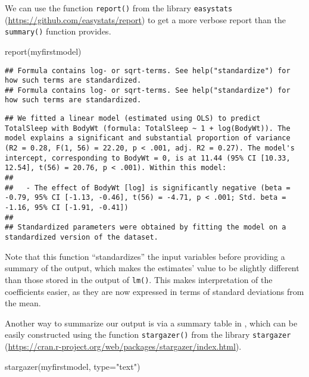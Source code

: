 \documentclass[
]{book}
\newenvironment{Shaded}{\begin{snugshade}}{\end{snugshade}}
\newcommand{\AttributeTok}[1]{\textcolor[rgb]{0.77,0.63,0.00}{#1}}
\newcommand{\FunctionTok}[1]{\textcolor[rgb]{0.00,0.00,0.00}{#1}}
\newcommand{\NormalTok}[1]{#1}
\newcommand{\StringTok}[1]{\textcolor[rgb]{0.31,0.60,0.02}{#1}}
\begin{document}
We can use the function \texttt{report()} from the library \texttt{easystats} (\url{https://github.com/easystats/report}) to get a more verbose report than the \texttt{summary()} function provides.

\begin{Shaded}
\begin{Highlighting}[]
\FunctionTok{report}\NormalTok{(myfirstmodel)}
\end{Highlighting}
\end{Shaded}

\begin{verbatim}
## Formula contains log- or sqrt-terms. See help("standardize") for how such terms are standardized.
## Formula contains log- or sqrt-terms. See help("standardize") for how such terms are standardized.
\end{verbatim}

\begin{verbatim}
## We fitted a linear model (estimated using OLS) to predict TotalSleep with BodyWt (formula: TotalSleep ~ 1 + log(BodyWt)). The model explains a significant and substantial proportion of variance (R2 = 0.28, F(1, 56) = 22.20, p < .001, adj. R2 = 0.27). The model's intercept, corresponding to BodyWt = 0, is at 11.44 (95% CI [10.33, 12.54], t(56) = 20.76, p < .001). Within this model:
## 
##   - The effect of BodyWt [log] is significantly negative (beta = -0.79, 95% CI [-1.13, -0.46], t(56) = -4.71, p < .001; Std. beta = -1.16, 95% CI [-1.91, -0.41])
## 
## Standardized parameters were obtained by fitting the model on a standardized version of the dataset.
\end{verbatim}

Note that this function ``standardizes'' the input variables before providing a summary of the output, which makes the estimates' value to be slightly different than those stored in the output of \texttt{lm()}. This makes interpretation of the coefficients easier, as they are now expressed in terms of standard deviations from the mean.

Another way to summarize our output is via a summary table in , which can be easily constructed using the function \texttt{stargazer()} from the library \texttt{stargazer} (\url{https://cran.r-project.org/web/packages/stargazer/index.html}).

\begin{Shaded}
\begin{Highlighting}[]
\FunctionTok{stargazer}\NormalTok{(myfirstmodel, }\AttributeTok{type=}\StringTok{"text"}\NormalTok{)}
\end{Highlighting}
\end{Shaded}
\end{document}

